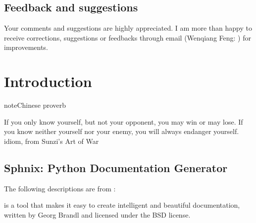 \documentclass[letterpaper,11pt,english]{sphinxmanual}
\begin{document}
\section{Feedback and suggestions}
\label{\detokenize{preface:feedback-and-suggestions}}
Your comments and suggestions are highly appreciated. I am more than happy to receive
corrections, suggestions or feedbacks through email (Wenqiang Feng: ) for improvements.


\chapter{Introduction}
\label{\detokenize{intro:introduction}}\label{\detokenize{intro:intro}}\label{\detokenize{intro::doc}}
\begin{sphinxadmonition}{note}{Chinese proverb}

If you only know yourself, but not your opponent, you may win or may lose.
If you know neither yourself nor your enemy, you will always endanger yourself.
\textendash{} idiom, from Sunzi’s Art of War
\end{sphinxadmonition}


\section{Sphnix: Python Documentation Generator}
\label{\detokenize{intro:sphnix-python-documentation-generator}}
The following descriptions are from :

 is a tool that makes it easy to create intelligent and beautiful documentation, written by Georg Brandl and licensed under the BSD license.
\end{document}
